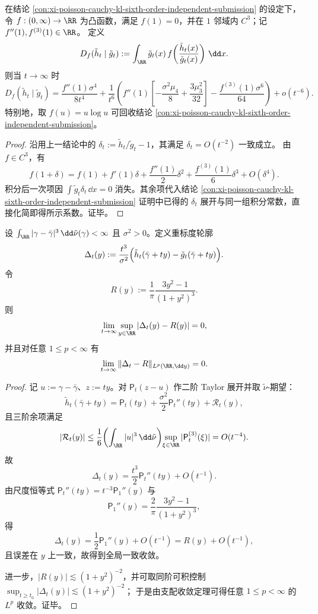 \begin{conclusion}\label{con:xi-poisson-cauchy-fdiv-sixth-order-independent}
在结论 \ref{con:xi-poisson-cauchy-kl-sixth-order-independent-submission} 的设定下，令 \(f:(0,\infty)\to\RR\) 为凸函数，满足 \(f(1)=0\)，并在 \(1\) 邻域内 \(C^3\)；记 \(f''(1),f^{(3)}(1)\in\RR\)。
定义
\[
D_f(\tilde h_t\mid \tilde g_t)
:=\int_{\RR}\tilde g_t(x)\,
f\!\left(\frac{\tilde h_t(x)}{\tilde g_t(x)}\right)\,\dd x.
\]
则当 \(t\to\infty\) 时
\[
D_f(\tilde h_t\mid \tilde g_t)
=\frac{f''(1)\sigma^4}{8t^4}
+\frac{1}{t^6}\left(
f''(1)\left[-\frac{\sigma^2\mu_4}{8}+\frac{3\mu_3^2}{32}\right]
-\frac{f^{(3)}(1)\sigma^6}{64}
\right)
+o(t^{-6}).
\]
特别地，取 \(f(u)=u\log u\) 可回收结论
\ref{con:xi-poisson-cauchy-kl-sixth-order-independent-submission}。
\end{conclusion}
\begin{proof}
沿用上一结论中的 \(\delta_t:=\tilde h_t/\tilde g_t-1\)，其满足 \(\delta_t=O(t^{-2})\) 一致成立。
由 \(f\in C^3\)，有
\[
f(1+\delta)
=f(1)+f'(1)\delta+\frac{f''(1)}{2}\delta^2+\frac{f^{(3)}(1)}{6}\delta^3+O(\delta^4).
\]
积分后一次项因
\(
\int \tilde g_t\delta_t\,\dd x=0
\)
消失。其余项代入结论
\ref{con:xi-poisson-cauchy-kl-sixth-order-independent-submission}
证明中已得的 \(\delta_t\) 展开与同一组积分常数，直接化简即得所示系数。证毕。
\end{proof}

\begin{conclusion}[二阶正规形的函数型极限定律与全局一致收敛]\label{con:xi-poisson-cauchy-second-order-profile-uniform-limit}
设 \(\int_{\RR}|\gamma-\bar\gamma|^3\,\dd\tilde\nu(\gamma)<\infty\) 且 \(\sigma^2>0\)。定义重标度轮廓
\[
\Delta_t(y):=\frac{t^3}{\sigma^2}\Bigl(\tilde h_t(\bar\gamma+ty)-\tilde g_t(\bar\gamma+ty)\Bigr).
\]
令
\[
R(y):=\frac1\pi\frac{3y^2-1}{(1+y^2)^3}.
\]
则
\[
\lim_{t\to\infty}\sup_{y\in\RR}|\Delta_t(y)-R(y)|=0,
\]
并且对任意 \(1\le p<\infty\) 有
\[
\lim_{t\to\infty}\|\Delta_t-R\|_{L^p(\RR,\dd y)}=0.
\]
\end{conclusion}
\begin{proof}
记 \(u:=\gamma-\bar\gamma\)、\(z:=ty\)。对 \(\mathsf P_t(z-u)\) 作二阶 Taylor 展开并取 \(\tilde\nu\)-期望：
\[
\tilde h_t(\bar\gamma+ty)
=\mathsf P_t(ty)+\frac{\sigma^2}{2}\mathsf P_t''(ty)+\mathcal R_t(y),
\]
且三阶余项满足
\[
|\mathcal R_t(y)|
\le \frac{1}{6}\!\left(\int_{\RR}|u|^3\,\dd\tilde\nu\right)\!
\sup_{\xi\in\RR}|\mathsf P_t^{(3)}(\xi)|
=O(t^{-4}).
\]
故
\[
\Delta_t(y)
=\frac{t^3}{2}\mathsf P_t''(ty)+O(t^{-1}).
\]
由尺度恒等式
\(
\mathsf P_t''(ty)=t^{-3}\mathsf P_1''(y)
\)
与
\[
\mathsf P_1''(y)=\frac{2}{\pi}\frac{3y^2-1}{(1+y^2)^3},
\]
得
\[
\Delta_t(y)=\frac12\mathsf P_1''(y)+O(t^{-1})=R(y)+O(t^{-1}),
\]
且误差在 \(y\) 上一致，故得到全局一致收敛。

进一步，\(|R(y)|\lesssim (1+y^2)^{-2}\)，并可取同阶可积控制 \(\sup_{t\ge t_0}|\Delta_t(y)|\lesssim (1+y^2)^{-2}\)；
于是由支配收敛定理可得任意 \(1\le p<\infty\) 的 \(L^p\) 收敛。证毕。
\end{proof}

